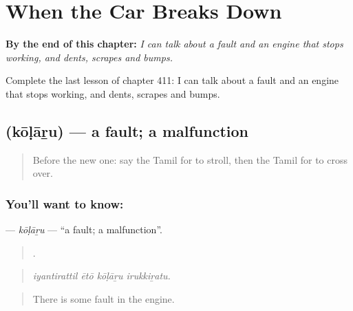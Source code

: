 
\chapter{When the Car Breaks Down}
\label{ch:ta-when-the-car-breaks-down}

\begin{chapteropening}
\textbf{By the end of this chapter:} \emph{I can talk about a fault and an engine that stops working, and dents, scrapes and bumps.}

Complete the last lesson of chapter 411: I can talk about a fault and an engine that stops working, and dents, scrapes and bumps.
\end{chapteropening}

\section[\texorpdfstring{\ta{கோளாறு} (kōḷāṟu)}{கோளாறு (kōḷāṟu)}]{ (kōḷāṟu) — a fault; a malfunction}

\label{lesson:TA-C411-kolaru}



\begin{quote}
Before the new one: say the Tamil for to stroll, then the Tamil for to cross over.
\end{quote}

\subsection*{You'll want to know: }
\textbf{} — \emph{kōḷāṟu} — \textquotedblleft{}a fault; a malfunction\textquotedblright{}.

\begin{quote}
   .
\end{quote}

\begin{quote}
\emph{iyantirattil ētō kōḷāṟu irukkiṟatu.}
\end{quote}

\begin{quote}
There is some fault in the engine.
\end{quote}

